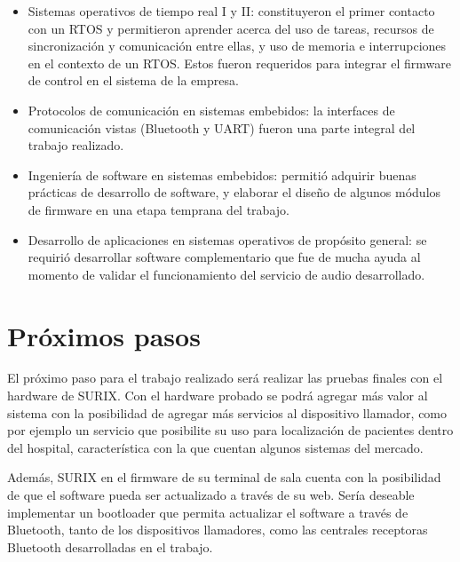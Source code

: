 \begin{itemize}

\item Sistemas operativos de tiempo real I y II: constituyeron el primer contacto con un RTOS y permitieron aprender acerca del uso de tareas, recursos de sincronización y comunicación entre ellas, y uso de memoria e interrupciones en el contexto de un RTOS. Estos fueron requeridos para integrar el firmware de control en el sistema de la empresa.

\item Protocolos de comunicación en sistemas embebidos: la interfaces de comunicación vistas (Bluetooth y UART) fueron una parte integral del trabajo realizado.

\item Ingeniería de software en sistemas embebidos: permitió adquirir buenas prácticas de desarrollo de software, y elaborar el diseño de algunos módulos de firmware en una etapa temprana del trabajo.

\item Desarrollo de aplicaciones en sistemas operativos de propósito general: se requirió desarrollar software complementario que fue de mucha ayuda al momento de validar el funcionamiento del servicio de audio desarrollado.

\end{itemize}


\section{Próximos pasos}

El próximo paso para el trabajo realizado será realizar las pruebas finales con el hardware de SURIX. Con el hardware probado se podrá agregar más valor al sistema con la posibilidad de agregar más servicios al dispositivo llamador, como por ejemplo un servicio que posibilite su uso para localización de pacientes dentro del hospital, característica con la que cuentan algunos sistemas del mercado.

Además, SURIX en el firmware de su terminal de sala cuenta con la posibilidad de que el software pueda ser actualizado a través de su web. Sería deseable implementar un bootloader que permita actualizar el software a través de Bluetooth, tanto de los dispositivos llamadores, como las centrales receptoras Bluetooth desarrolladas en el trabajo.

